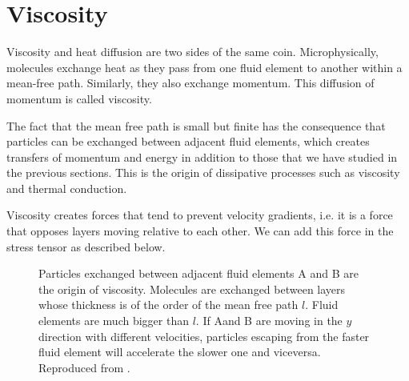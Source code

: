 
\section{Viscosity}

Viscosity and heat diffusion are two sides of the same
coin. Microphysically, molecules exchange heat as they pass from one
fluid element to another within a mean-free path. Similarly, they also
exchange momentum. This diffusion of momentum is called viscosity. 

The fact that the mean free path is small but finite has the consequence
that particles can be exchanged between adjacent fluid elements, which
creates transfers of momentum and energy in addition to those that we
have studied in the previous sections. This is the origin of dissipative
processes such as viscosity and thermal conduction.

Viscosity creates forces that tend to prevent velocity gradients, i.e.
it is a force that opposes layers moving relative to each other. We
can add this force in the stress tensor as described below. 

\begin{figure}
  \begin{center}
  \end{center}
  \caption[]{Particles exchanged between adjacent fluid elements A and
    B are the origin of viscosity. Molecules are exchanged between layers whose thickness is of the order of the
    mean free path $l$. Fluid elements are much bigger than $l$. If Aand B are moving in
    the $y$ direction with diﬀerent velocities, particles escaping from the faster fluid
    element will accelerate the slower one and viceversa. Reproduced
    from \cite{Sormani22}.}
  \label{fig:viscosity}
\end{figure}

